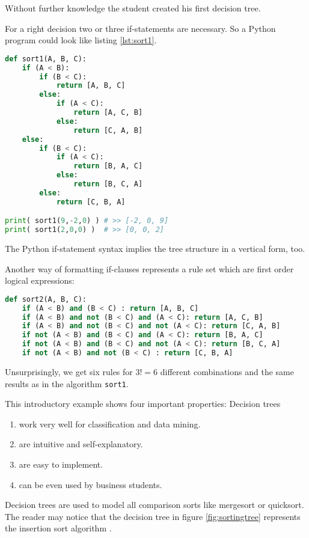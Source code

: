 Without further knowledge the student created his first decision tree.

For a right decision two or three if-statements are necessary. So a Python program could look like listing \ref{lst:sort1}.

\newpage

\begin{lstlisting}[style = fau, language = Python, caption={[A Python implementation of a decision tree for sorting three elements]A Python implementation of a decision tree for sorting three elements $A, B, C$},label=lst:sort1]
def sort1(A, B, C):
	if (A < B):
		if (B < C):
			return [A, B, C]
		else:
			if (A < C):
				return [A, C, B]
			else:
				return [C, A, B]
	else:
		if (B < C):
			if (A < C):
				return [B, A, C]
			else:
				return [B, C, A]
		else:
			return [C, B, A]

print( sort1(9,-2,0) ) # >> [-2, 0, 9]
print( sort1(2,0,0) )  # >> [0, 0, 2]
\end{lstlisting}

\begin{remark}
    The Python if-statement syntax implies the tree structure in a vertical form, too.      
\end{remark}

Another way of formatting if-clauses represents a rule set which are first order logical expressions:  
    \begin{lstlisting}[style = fau, language = Python, caption={A Python reimplementation of the decision tree given in listing \ref{lst:sort1} as a set of first order logical rules},label=lst:sort2]
def sort2(A, B, C):
	if (A < B) and (B < C) : return [A, B, C]
	if (A < B) and not (B < C) and (A < C): return [A, C, B]
	if (A < B) and not (B < C) and not (A < C): return [C, A, B]
	if not (A < B) and (B < C) and (A < C): return [B, A, C]
	if not (A < B) and (B < C) and not (A < C): return [B, C, A]
	if not (A < B) and not (B < C) : return [C, B, A]
\end{lstlisting}

Unsurprisingly, we get six rules for $3! = 6$ different combinations and the same results as in the algorithm \texttt{sort1}. 


This introductory example shows four important properties: Decision trees
\begin{enumerate}
    \item work very well for classification and data mining.
    \item are intuitive and self-explanatory.
    \item are easy to implement.
    \item can be even used by business students.
\end{enumerate}

\begin{remark}
    Decision trees are used to model all comparison sorts like mergesort or quicksort. The reader may notice that the decision tree in figure \ref{fig:sortingtree} represents the insertion sort algorithm \cite[p. 208]{cormen2001introduction}. 
\end{remark}




